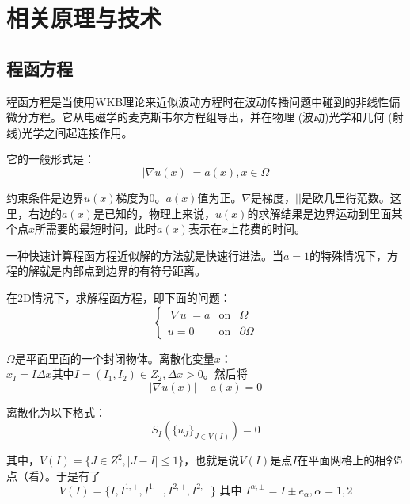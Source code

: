 \chapter{相关原理与技术}
\label{technique}

\section{程函方程}
程函方程是当使用WKB理论来近似波动方程时在波动传播问题中碰到的非线性偏微分方程。它从电磁学的麦克斯韦尔方程组导出，并在物理 (波动)光学和几何 (射线)光学之间起连接作用。

它的一般形式是：
\begin{equation}
    \label{eikonal_equation_1}
    \left| \nabla u(x) \right| = a(x), x \in \Omega
\end{equation}

约束条件是边界$u(x)$梯度为0。$a(x)$值为正。$\nabla$是梯度，$\left| \right|$是欧几里得范数。这里，右边的$a(x)$是已知的，物理上来说，$u(x)$的求解结果是边界运动到里面某个点$x$所需要的最短时间，此时$a(x)$表示在$x$上花费的时间。

一种快速计算程函方程近似解的方法就是快速行进法。当$a = 1$的特殊情况下，方程的解就是内部点到边界的有符号距离。

在2D情况下，求解程函方程，即下面的问题：
\begin{equation*}
    \label{eikonal_equation_2}
    \left\{
    \begin{aligned}
    \left| \nabla u \right| = a & \mbox{on} & \Omega \\
    u = 0 & \mbox{on} &  \partial\Omega
    \end{aligned}
    \right.
\end{equation*}

$\Omega$是平面里面的一个封闭物体。离散化变量$x$：$x_{I} = I\Delta x\mbox{其中}I = (I_{1}, I_{2}) \in Z_{2}, \Delta x > 0$。然后将
\begin{equation*}
    \label{eikonal_equation_3}
    \left| \nabla u(x) \right| - a(x) = 0
\end{equation*}

离散化为以下格式：
\begin{equation*}
    \label{scheme}
    S_{I}(\{u_{J}\}_{J \in V(I)}) = 0
\end{equation*}

其中，$V(I) = \{J \in Z^{2}, \left| J - I \right| \leq 1\}$，也就是说$V(I)$是点$I$在平面网格上的相邻5点（看）。于是有了
\begin{equation*}
    \label{eikonal_equation_3}
    V(I) = \{I, I^{1, +}, I^{1, -}, I^{2, +}, I^{2, -}\} \mbox{ 其中 } I^{\alpha, \pm}  = I \pm e_{\alpha}, \alpha = 1, 2
\end{equation*}

